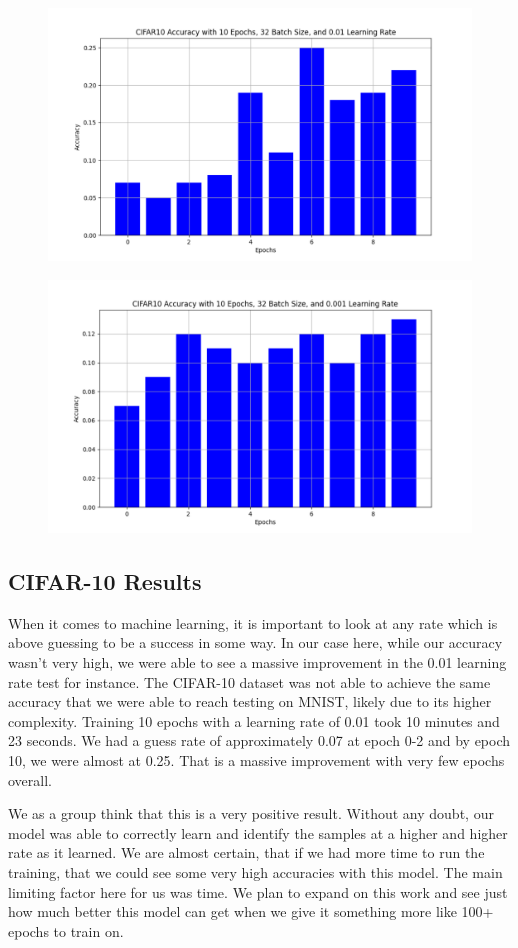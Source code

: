 \documentclass{article}
\begin{document}
\begin{figure}[!h]
    \centering
    \includegraphics[width=0.75\linewidth]{figs/CIFAR A 10-32-0.01.png}
\end{figure}

\begin{figure}[!h]
    \centering
    \includegraphics[width=0.75\linewidth]{figs/CIFAR A 10-32-0.001.png}
\end{figure}

\subsection{CIFAR-10 Results}
When it comes to machine learning, it is important to look at any rate which is above guessing to be a success in some way. In our case here, while our accuracy wasn't very high, we were able to see a massive improvement in the 0.01 learning rate test for instance. The CIFAR-10 dataset was not able to achieve the same accuracy that we were able to reach testing on MNIST, likely due to its higher complexity. Training 10 epochs with a learning rate of 0.01 took 10 minutes and 23 seconds. We had a guess rate of approximately 0.07 at epoch 0-2 and by epoch 10, we were almost at 0.25. That is a massive improvement with very few epochs overall.

We as a group think that this is a very positive result. Without any doubt, our model was able to correctly learn and identify the samples at a higher and higher rate as it learned. We are almost certain, that if we had more time to run the training, that we could see some very high accuracies with this model. The main limiting factor here for us was time. We plan to expand on this work and see just how much better this model can get when we give it something more like 100+ epochs to train on.
\end{document}

